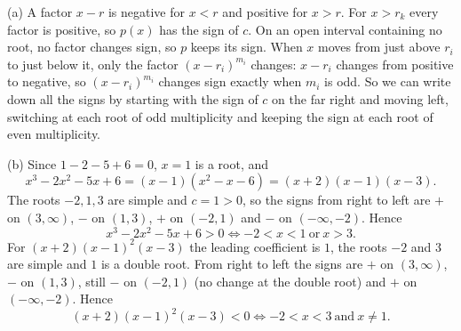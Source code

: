(a) A factor $x-r$ is negative for $x<r$ and positive for $x>r$. For $x>r_k$ every factor is positive, so $p(x)$ has the sign of $c$. On an open interval containing no root, no factor changes sign, so $p$ keeps its sign. When $x$ moves from just above $r_i$ to just below it, only the factor $(x-r_i)^{m_i}$ changes: $x-r_i$ changes from positive to negative, so $(x-r_i)^{m_i}$ changes sign exactly when $m_i$ is odd. So we can write down all the signs by starting with the sign of $c$ on the far right and moving left, switching at each root of odd multiplicity and keeping the sign at each root of even multiplicity.

(b) Since $1-2-5+6=0$, $x=1$ is a root, and
\[
x^3-2x^2-5x+6=(x-1)(x^2-x-6)=(x+2)(x-1)(x-3).
\]
The roots $-2,1,3$ are simple and $c=1>0$, so the signs from right to left are $+$ on $(3,\infty)$, $-$ on $(1,3)$, $+$ on $(-2,1)$ and $-$ on $(-\infty,-2)$. Hence
\[
x^3-2x^2-5x+6>0\iff \boxed{-2<x<1\ \text{or}\ x>3}.
\]
For $(x+2)(x-1)^2(x-3)$ the leading coefficient is $1$, the roots $-2$ and $3$ are simple and $1$ is a double root. From right to left the signs are $+$ on $(3,\infty)$, $-$ on $(1,3)$, still $-$ on $(-2,1)$ (no change at the double root) and $+$ on $(-\infty,-2)$. Hence
\[
(x+2)(x-1)^2(x-3)<0\iff \boxed{-2<x<3\ \text{and}\ x\ne1}.
\]
